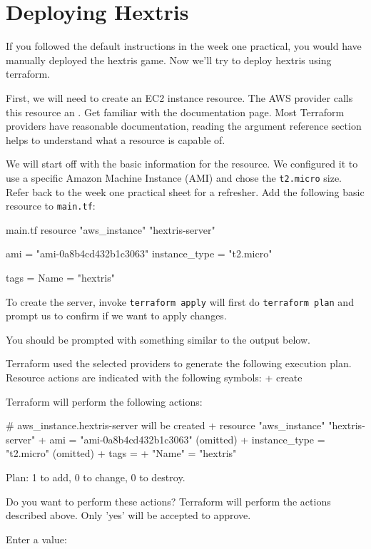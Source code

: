 \documentclass{csse4400}
\begin{document}
\section{Deploying Hextris}
If you followed the default instructions in the week one practical, you would have manually deployed the hextris game.
Now we'll try to deploy hextris using terraform.

First, we will need to create an EC2 instance resource.
The AWS provider calls this resource an .
Get familiar with the documentation page.
Most Terraform providers have reasonable documentation, reading the argument reference section helps to understand what a resource is capable of.

We will start off with the basic information for the resource.
We configured it to use a specific Amazon Machine Instance (AMI) and chose the \texttt{t2.micro} size.
Refer back to the week one practical sheet for a refresher.
Add the following basic resource to \texttt{main.tf}:

\begin{code}[language=terraform]{main.tf}
resource "aws_instance" "hextris-server" {
    ami           = "ami-0a8b4cd432b1c3063"
    instance_type = "t2.micro"
    
    tags = {
        Name = "hextris"
    }
}      
\end{code}

To create the server, invoke
\texttt{terraform apply} will first do \texttt{terraform plan} and prompt us to confirm if we want to apply changes.


You should be prompted with something similar to the output below.

\begin{code}[language=terraform-plan]{}
Terraform used the selected providers to generate the following execution plan. Resource actions are indicated with the following symbols:
  + create

Terraform will perform the following actions:

  # aws_instance.hextris-server will be created
  + resource "aws_instance" "hextris-server" {
      + ami                                  = "ami-0a8b4cd432b1c3063"
      (omitted)
      + instance_type                        = "t2.micro"
      (omitted)
      + tags                                 = {
          + "Name" = "hextris"
        }
    }

Plan: 1 to add, 0 to change, 0 to destroy.

Do you want to perform these actions?
  Terraform will perform the actions described above.
  Only 'yes' will be accepted to approve.

  Enter a value: 
\end{code}
\end{document}
